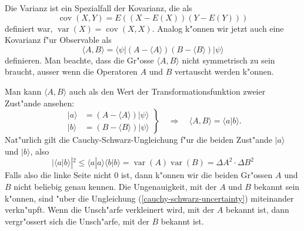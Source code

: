 Die Varianz ist ein Spezialfall der Kovarianz, die als 
\[
\operatorname{cov}(X,Y)
=
E((X-E(X))(Y-E(Y)))
\]
definiert war, $\operatorname{var}(X)=\operatorname{cov}(X,X)$.
Analog k"onnen wir jetzt auch eine Kovarianz f"ur Observable als
\[
\langle A,B\rangle
=
\langle\psi|
(A-\langle A\rangle)(B-\langle B\rangle)
|\psi\rangle
\]
definieren.
Man beachte, dass die Gr"osse $\langle A,B\rangle$ nicht symmetrisch zu
sein braucht, ausser wenn die Operatoren $A$ und $B$ vertauscht werden
k"onnen.

Man kann $\langle A,B\rangle$ auch als den Wert der Transformationsfunktion 
zweier Zust"ande ansehen:
\begin{equation}
\left.
\begin{aligned}
|a\rangle &= (A-\langle A\rangle)|\psi\rangle\\
|b\rangle &= (B-\langle B\rangle)|\psi\rangle
\end{aligned}
\right\}
\quad
\Rightarrow
\quad
\langle A,B\rangle = \langle a|b\rangle.
\end{equation}
Nat"urlich gilt die Cauchy-Schwarz-Ungleichung f"ur die beiden
Zust"ande $|a\rangle$ und $|b\rangle$, also
\begin{equation}
|\langle a|b\rangle|^2
\le
\langle a|a\rangle \langle b|b\rangle
=
\operatorname{var}(A)\operatorname{var}(B)
=\Delta A^2 \cdot \Delta B^2
\label{cauchy-schwarz-uncertainty}
\end{equation}
Falls also die linke Seite nicht $0$ ist, dann k"onnen wir die beiden
Gr"ossen $A$ und $B$ nicht beliebig genau kennen.
Die Ungenauigkeit, mit der $A$ und $B$ bekannt sein k"onnen, sind "uber
die Ungleichung (\ref{cauchy-schwarz-uncertainty}) miteinander verkn"upft.
Wenn die Unsch"arfe verkleinert wird, mit der $A$ bekannt ist, dann 
vergr"ossert sich die Unsch"arfe, mit der $B$ bekannt ist.

%
%
